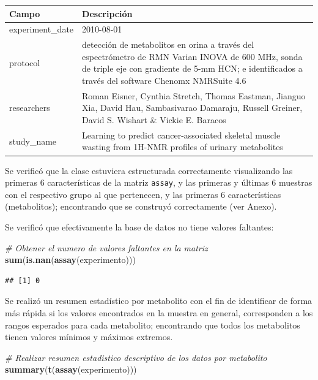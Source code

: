 \documentclass[
]{article}
\newenvironment{Shaded}{\begin{snugshade}}{\end{snugshade}}
\newcommand{\CommentTok}[1]{\textcolor[rgb]{0.56,0.35,0.01}{\textit{#1}}}
\newcommand{\FunctionTok}[1]{\textcolor[rgb]{0.13,0.29,0.53}{\textbf{#1}}}
\newcommand{\NormalTok}[1]{#1}
\begin{document}
\begin{longtable}[t]{ll}
\toprule
Campo & Descripción\\
\midrule
experiment\_date & 2010-08-01\\
protocol & detección de metabolitos en orina a través del espectrómetro de RMN Varian INOVA de 600 MHz, sonda de triple eje con gradiente de 5-mm HCN; e identificados a través del software Chenomx NMRSuite 4.6\\
researchers & Roman Eisner, Cynthia Stretch, Thomas Eastman, Jianguo Xia, David Hau, Sambasivarao Damaraju, Russell Greiner, David S. Wishart \& Vickie E. Baracos\\
study\_name & Learning to predict cancer-associated skeletal muscle wasting from 1H-NMR profiles of urinary metabolites\\
\bottomrule
\end{longtable}

Se verificó que la clase estuviera estructurada correctamente
visualizando las primeras 6 características de la matriz \texttt{assay},
y las primeras y últimas 6 muestras con el respectivo grupo al que
pertenecen, y las primeras 6 características (metabolitos); encontrando
que se construyó correctamente (ver Anexo).

Se verificó que efectivamente la base de datos no tiene valores
faltantes:

\begin{Shaded}
\begin{Highlighting}[]
\CommentTok{\# Obtener el numero de valores faltantes en la matriz}
\FunctionTok{sum}\NormalTok{(}\FunctionTok{is.nan}\NormalTok{(}\FunctionTok{assay}\NormalTok{(experimento)))}
\end{Highlighting}
\end{Shaded}

\begin{verbatim}
## [1] 0
\end{verbatim}

Se realizó un resumen estadístico por metabolito con el fin de
identificar de forma más rápida si los valores encontrados en la muestra
en general, corresponden a los rangos esperados para cada metabolito;
encontrando que todos los metabolitos tienen valores mínimos y máximos
extremos.

\begin{Shaded}
\begin{Highlighting}[]
\CommentTok{\# Realizar resumen estadistico descriptivo de los datos por metabolito}
\FunctionTok{summary}\NormalTok{(}\FunctionTok{t}\NormalTok{(}\FunctionTok{assay}\NormalTok{(experimento)))}
\end{Highlighting}
\end{Shaded}
\end{document}
